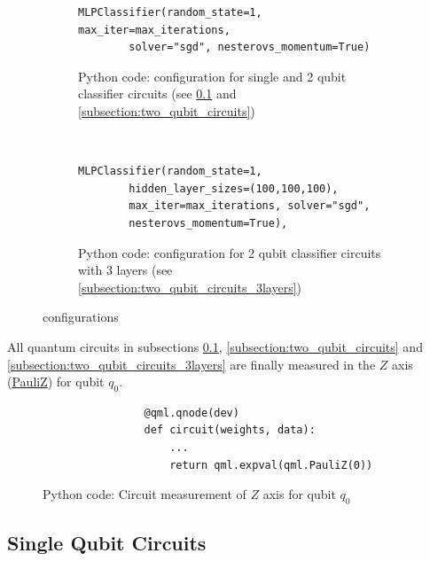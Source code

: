 \begin{figure}[h!]
    \centering
    \begin{subfigure}{0.75\textwidth}
        \begin{verbatim}
MLPClassifier(random_state=1, max_iter=max_iterations, 
        solver="sgd", nesterovs_momentum=True)
        \end{verbatim}
        \caption{Python code:  configuration for single and 2 qubit classifier circuits (see \ref{subsection:single_qubit_circuits} and \ref{subsection:two_qubit_circuits})}
        \label{fig:code_MLPClassifier_configuration}
    \end{subfigure}
    \\[3ex]
    \begin{subfigure}{0.66\textwidth}
        \begin{verbatim}
MLPClassifier(random_state=1, 
        hidden_layer_sizes=(100,100,100), 
        max_iter=max_iterations, solver="sgd", 
        nesterovs_momentum=True),
        \end{verbatim}
        \caption{Python code:  configuration for 2 qubit classifier circuits with 3 layers (see \ref{subsection:two_qubit_circuits_3layers})}
        \label{fig:code_MLPClassifier_configuration_3hiddenlayers}
    \end{subfigure}
    \caption{ configurations}
    \label{fig:MLPClassifier_configurations}
\end{figure}

All quantum circuits in subsections \ref{subsection:single_qubit_circuits}, \ref{subsection:two_qubit_circuits} and \ref{subsection:two_qubit_circuits_3layers} are finally measured in the $Z$ axis (\href{https://pennylane.readthedocs.io/en/stable/code/api/pennylane.PauliZ.html}{PauliZ}) for qubit $q_0$. 

\begin{figure}[h!]
    \centering
    \begin{verbatim}
                @qml.qnode(dev)
                def circuit(weights, data):
                    ...
                    return qml.expval(qml.PauliZ(0))
    \end{verbatim}
    \caption{Python code: Circuit measurement of $Z$ axis for qubit $q_0$}
    \label{fig:code_quantum_classifiers_measurement}
\end{figure}

\clearpage
\subsection{Single Qubit Circuits}
\label{subsection:single_qubit_circuits}

